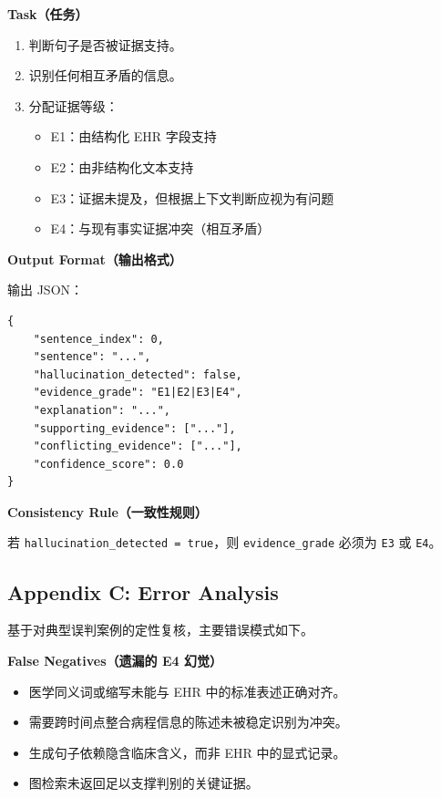 \documentclass[11pt]{article}
\providecommand{\tightlist}{\setlength{\itemsep}{0pt}\setlength{\parskip}{0pt}}
\begin{document}
\textbf{Task（任务）}

\begin{enumerate}
\def\labelenumi{\arabic{enumi}.}
\tightlist
\item
  判断句子是否被证据支持。
\item
  识别任何相互矛盾的信息。
\item
  分配证据等级：

  \begin{itemize}
  \tightlist
  \item
    E1：由结构化 EHR 字段支持
  \item
    E2：由非结构化文本支持
  \item
    E3：证据未提及，但根据上下文判断应视为有问题
  \item
    E4：与现有事实证据冲突（相互矛盾）
  \end{itemize}
\end{enumerate}

\textbf{Output Format（输出格式）}

输出 JSON：

\begin{verbatim}
{
    "sentence_index": 0,
    "sentence": "...",
    "hallucination_detected": false,
    "evidence_grade": "E1|E2|E3|E4",
    "explanation": "...",
    "supporting_evidence": ["..."],
    "conflicting_evidence": ["..."],
    "confidence_score": 0.0
}
\end{verbatim}

\textbf{Consistency Rule（一致性规则）}

若 \texttt{hallucination\_detected\ =\ true}，则 \texttt{evidence\_grade} 必须为 \texttt{E3} 或 \texttt{E4}。

\subsection{Appendix C: Error Analysis}

基于对典型误判案例的定性复核，主要错误模式如下。

\textbf{False Negatives（遗漏的 E4 幻觉）}

\begin{itemize}
\tightlist
\item
  医学同义词或缩写未能与 EHR 中的标准表述正确对齐。
\item
  需要跨时间点整合病程信息的陈述未被稳定识别为冲突。
\item
  生成句子依赖隐含临床含义，而非 EHR 中的显式记录。
\item
  图检索未返回足以支撑判别的关键证据。
\end{itemize}
\end{document}
